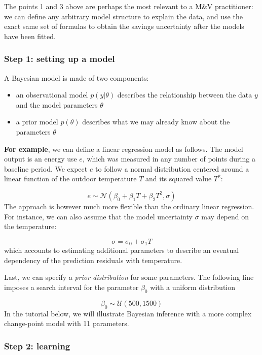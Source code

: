 \documentclass[
]{article}
\providecommand{\tightlist}{%
  \setlength{\itemsep}{0pt}\setlength{\parskip}{0pt}}
\begin{document}
The points 1 and 3 above are perhaps the most relevant to a M\&V practitioner: we can define any arbitrary model structure to explain the data, and use the exact same set of formulas to obtain the savings uncertainty after the models have been fitted.

\hypertarget{step-1-setting-up-a-model}{%
\subsubsection{Step 1: setting up a model}\label{step-1-setting-up-a-model}}

A Bayesian model is made of two components:

\begin{itemize}
\tightlist
\item
  an observational model \(p(y|\theta)\) describes the relationship between the data \(y\) and the model parameters \(\theta\)
\item
  a prior model \(p(\theta)\) describes what we may already know about the parameters \(\theta\)
\end{itemize}

\textbf{For example}, we can define a linear regression model as follows. The model output is an energy use \(e\), which was measured in any number of points during a baseline period. We expect \(e\) to follow a normal distribution centered around a linear function of the outdoor temperature \(T\) and its squared value \(T^2\):

\[ e \sim \mathcal{N}(\beta_0 + \beta_1 T + \beta_2 T^2, \sigma)\]
The approach is however much more flexible than the ordinary linear regression. For instance, we can also assume that the model uncertainty \(\sigma\) may depend on the temperature:

\[ \sigma = \sigma_0 + \sigma_1 T\]
which accounts to estimating additional parameters to describe an eventual dependency of the prediction residuals with temperature.

Last, we can specify a \emph{prior distribution} for some parameters. The following line imposes a search interval for the parameter \(\beta_0\) with a uniform distribution

\[ \beta_0 \sim \mathcal{U}(500, 1500)\]
In the tutorial below, we will illustrate Bayesian inference with a more complex change-point model with 11 parameters.

\hypertarget{step-2-learning}{%
\subsubsection{Step 2: learning}\label{step-2-learning}}
\end{document}

